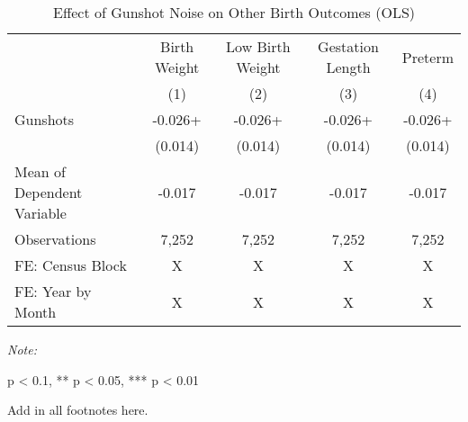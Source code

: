 \begin{table}[H]
\centering
\caption{\label{other_birth_outcomes}Effect of Gunshot Noise on Other Birth Outcomes (OLS)}
\centering
\begin{threeparttable}
\fontsize{11}{13}\selectfont
\begin{tabular}[t]{>{\raggedright\arraybackslash}p{5cm}cccc}
\toprule
\multicolumn{1}{c}{ } & \multicolumn{1}{c}{Birth Weight} & \multicolumn{1}{c}{Low Birth Weight} & \multicolumn{1}{c}{Gestation Length} & \multicolumn{1}{c}{Preterm} \\
\cmidrule(l{3pt}r{3pt}){2-2} \cmidrule(l{3pt}r{3pt}){3-3} \cmidrule(l{3pt}r{3pt}){4-4} \cmidrule(l{3pt}r{3pt}){5-5}
  & (1) & (2) & (3) & (4)\\
\midrule
Gunshots & -0.026+ & -0.026+ & -0.026+ & -0.026+\\
 & (0.014) & (0.014) & (0.014) & (0.014)\\
Mean of Dependent Variable & -0.017 & -0.017 & -0.017 & -0.017\\
Observations & 7,252 & 7,252 & 7,252 & 7,252\\
FE: Census Block & X & X & X & X\\
\addlinespace
FE: Year by Month & X & X & X & X\\
\bottomrule
\end{tabular}
\begin{tablenotes}
\item \textit{Note: } 
\item * p < 0.1, ** p < 0.05, *** p < 0.01
\item Add in all footnotes here.
\end{tablenotes}
\end{threeparttable}
\end{table}
